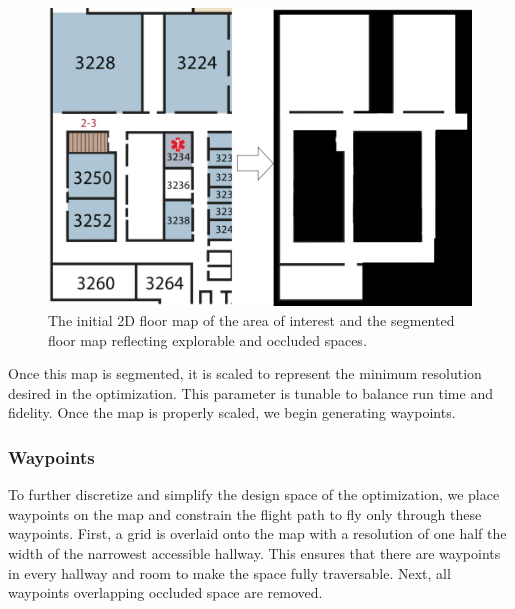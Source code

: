 \documentclass[letterpaper, 10 pt, conference]{ieeeconf}  %
\begin{document}
\begin{figure}
\centering
\includegraphics[width=1.0\linewidth]{map_bw.png}
\caption[An example of area segmentation for the coverage planner.]{The initial 2D floor map of the area of interest and the segmented floor map reflecting explorable and occluded spaces.}
\label{fig:map_gen}
\end{figure}

Once this map is segmented, it is scaled to represent the minimum resolution desired in the optimization. This parameter is tunable to balance run time and fidelity. Once the map is properly scaled, we begin generating waypoints.

\subsubsection{Waypoints}

To further discretize and simplify the design space of the optimization, we place waypoints on the map and constrain the flight path to fly only through these waypoints. First, a grid is overlaid onto the map with a resolution of one half the width of the narrowest accessible hallway. This ensures that there are waypoints in every hallway and room to make the space fully traversable. Next, all waypoints overlapping occluded space are removed.
\end{document}
